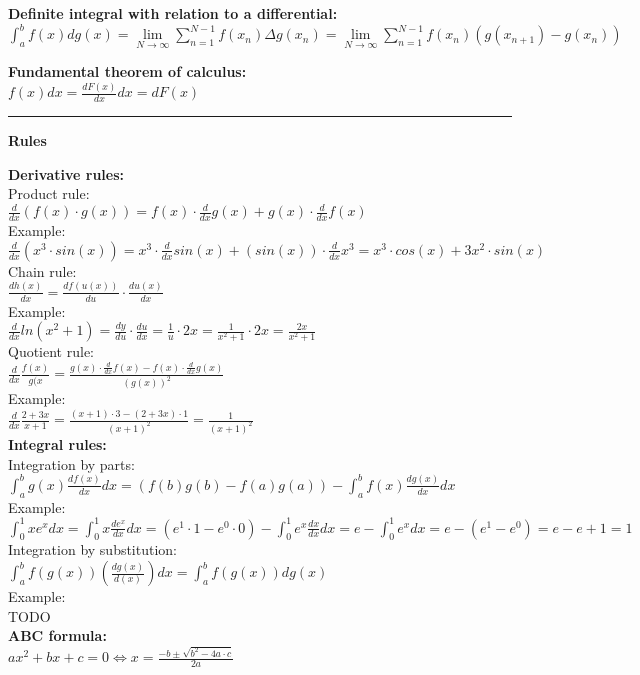 \documentclass[12pt,a4paper]{report}
\begin{document}
	\textbf{Definite integral with relation to a differential:}\\
	$\int_{a}^{b} f(x)dg(x) = \lim\limits_{N \to \infty} \sum_{n = 1}^{N - 1} f(x_n)\Delta g(x_n) = \lim\limits_{N \to \infty} \sum_{n = 1}^{N - 1} f(x_n)(g(x_{n+1}) - g(x_n))$
	
	\textbf{Fundamental theorem of calculus:}\\
	$f(x)dx = \frac{dF(x)}{dx}dx = dF(x)$

	\rule{17cm}{1pt}

	\begin{center}\textbf{Rules}\end{center}
	
	\textbf{Derivative rules:}\\
	Product rule:\\
	$\frac{d}{dx}(f(x) \cdot g(x)) = f(x) \cdot \frac{d}{dx}g(x) + g(x) \cdot \frac{d}{dx}f(x)$\\
	Example:\\
	$\frac{d}{dx}(x^3 \cdot sin(x)) = x^3 \cdot \frac{d}{dx} sin(x) + (sin (x)) \cdot \frac{d}{dx} x^3 = x^3 \cdot cos(x) + 3x^2 \cdot sin(x)$\\
	Chain rule:\\
	$\frac{dh(x)}{dx} = \frac{df(u(x))}{du} \cdot \frac{du(x)}{dx}$\\
	Example:\\
	$\frac{d}{dx} ln(x^2 + 1) = \frac{dy}{du} \cdot \frac{du}{dx} = \frac{1}{u} \cdot 2x = \frac{1}{x^2 +1} \cdot 2x = \frac{2x}{x^2 + 1}$\\
	Quotient rule:\\
	$\frac{d}{dx}\frac{f(x)}{g(x} = \frac{g(x) \cdot \frac{d}{dx} f(x) - f(x) \cdot \frac{d}{dx}g(x)}{(g(x))^2}$\\
	Example:\\
	$\frac{d}{dx}\frac{2+3x}{x+1} = \frac{(x+1)\cdot3-(2+3x)\cdot1}{(x+1)^2} = \frac{1}{(x+1)^2}$\\
	
	\textbf{Integral rules:}\\
	Integration by parts:\\
	$\int_{a}^{b} g(x) \frac{df(x)}{dx} dx = (f(b)g(b) - f(a)g(a)) - \int_{a}^{b} f(x) \frac{dg(x)}{dx}dx$\\
	Example:\\
	$\int_{0}^{1} xe^x dx = \int_{0}^{1} x \frac{d e^x}{dx} dx = (e^1 \cdot 1 - e^0 \cdot 0) - \int_{0}^{1} e^x \frac{dx}{dx}dx = e - \int_{0}^{1} e^x dx = e - (e^1 - e^0) = e - e+1 = 1$\\
	Integration by substitution:\\
	$\int_{a}^{b} f(g(x)) (\frac{dg(x)}{d(x)}) dx = \int_{a}^{b} f(g(x)) dg(x)$\\
	Example:\\
	TODO\\
	\textbf{ABC formula:}\\
	$ax^2 + bx + c = 0 \iff x = \frac{-b \pm \sqrt{b^2 - 4a \cdot c}}{2a}$\\
	
\end{document}
